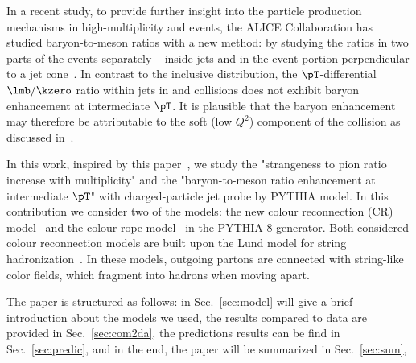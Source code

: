 \documentclass[ALICE,manyauthors]{StrinJet}
\begin{document}
In a recent study, to provide further insight into the particle production mechanisms in high-multiplicity \pp and \pPb events,
the ALICE Collaboration has studied baryon-to-meson ratios with a new method: by studying the ratios in two parts of the events separately -- inside jets and in the event portion perpendicular to a jet cone~\cite{ALICE:2021cvd}. 
In contrast to the inclusive distribution, the $\pT$-differential $\lmb/\kzero$ ratio within jets in \pp and \pPb collisions does not exhibit baryon enhancement at intermediate $\pT$.
It is plausible that the baryon enhancement may therefore be attributable to the soft (low $Q^{2}$) component of the collision as discussed in~\cite{Cuautle:2014yda}.

In this work, inspired by this paper~\cite{ALICE:2021cvd}, we study the "strangeness to pion ratio increase with multiplicity" and the "baryon-to-meson ratio enhancement at intermediate $\pT$" with charged-particle jet probe by PYTHIA model. 
In this contribution we consider two of the models: the new colour reconnection (CR) model~\cite{Christiansen:2015yqa, Sjostrand:2014zea} and the colour rope model~\cite{Biro:1984cf, Bierlich:2014xba, Flensburg:2011kk} in the PYTHIA 8 generator.
Both considered colour reconnection models are built upon the Lund model for string hadronization~\cite{Andersson:1983ia, Buckley:2011ms}.  In these models, outgoing partons are connected with string-like color fields, which fragment into hadrons when moving apart.

The paper is structured as follows: in Sec.~\ref{sec:model} will give a brief introduction about the models we used, the results compared to data are provided in Sec.~\ref{sec:com2da}, the predictions results can be find in Sec.~\ref{sec:predic}, and in the end, the paper will be summarized in Sec.~\ref{sec:sum},


\end{document}
